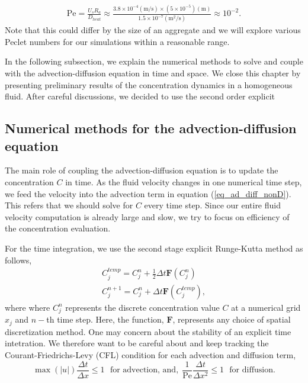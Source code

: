 \begin{align}
	\text{Pe} 
	= \frac{U_s R_a }{D_{heat}} 
	\approx \frac{3.8 \times 10^{-4}(\text{m/s}) \times \left(5 \times 10^{-5} \right) (\text{m})}{1.5 \times 10^{-7} (\text{m}^2\text{/s})} \approx 10^{-2}.
\end{align}
Note that this could differ by the size of an aggregate and we will explore various Peclet numbers for our simulations within a reasonable range. 
\par 
In the following subsection, we explain the numerical methods to solve and couple with the advection-diffusion equation in time and space. We close this chapter by presenting preliminary results of the concentration dynamics in a homogeneous fluid. 
After careful discussions, we decided to use the second order explicit 
\subsection{Numerical methods for the advection-diffusion equation}
The main role of coupling the advection-diffusion equation is to update the concentration $C$ in time. As the fluid velocity changes in one numerical time step, we feed the velocity into the advection term in equation (\ref{eq_ad_diff_nonD}). This refers that we should solve for $C$ every time step. Since our entire fluid velocity computation is already large and slow, we try to focus on efficiency of the concentration evaluation.
\par
For the time integration, we use the second stage explicit Runge-Kutta method as follows,
\begin{align}
	C_{j}^{temp} = C_j^{n} + \frac{1}{2}\Delta t {\bm F} \left( C_j^{n} \right)
	\\ 
	C_j^{n+1} = C_j^{n} + \Delta t {\bm F} \left( C_j^{temp} \right),
\end{align}
where where $C_j^n$  represents the discrete concentration value $C$ at a numerical grid $x_j$ and $n-$th time step.
Here, the function, $\bm{F}$, represents any choice of spatial discretization method. 
One may concern about the stability of an explicit time intetration. We therefore want to be careful about and keep tracking the Courant-Friedrichs-Levy (CFL) condition for each advection and diffusion term,
\begin{equation}
	\max(|u|) \frac{\Delta t}{\Delta x}  \leq 1 \ \ \ \text{for advection, and,}
	\ \  \frac{1}{\text{Pe}}\frac{\Delta t}{\Delta x^2}  \leq 1 \ \ \ \text{for diffusion}.
	\end{equation}
